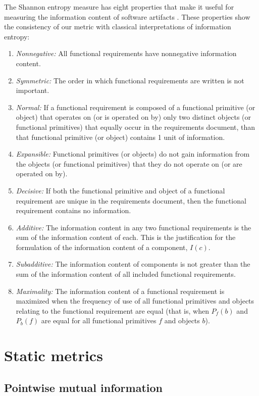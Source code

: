\documentclass{article}
\begin{document}
The Shannon entropy measure has eight properties that make it useful
for measuring the information content of software artifacts
\cite{abd-el-hafiz}. These properties show the consistency of our
metric with classical interpretations of information entropy:
\begin{enumerate}
\item \textit{Nonnegative:} All functional requirements have
  nonnegative information content.
\item \textit{Symmetric:} The order in which functional requirements
  are written is not important.
\item \textit{Normal:} If a functional requirement is composed of a
  functional primitive (or object) that operates on (or is operated on
  by) only two distinct objects (or functional primitives) that
  equally occur in the requirements document, than that functional
  primitive (or object) contains 1 unit of information.
\item \textit{Expansible:} Functional primitives (or objects) do not
  gain information from the objects (or functional primitives) that
  they do not operate on (or are operated on by).
\item \textit{Decisive:} If both the functional primitive and object
  of a functional requirement are unique in the requirements document,
  then the functional requirement contains no information.
\item \textit{Additive:} The information content in any two functional
  requirements is the sum of the information content of each. This is
  the justification for the formulation of the information content of
  a component, $I(c)$.
\item \textit{Subadditive:} The information content of components is
  not greater than the sum of the information content of all included
  functional requirements.
\item \textit{Maximality:} The information content of a functional
  requirement is maximized when the frequency of use of all functional
  primitives and objects relating to the functional requirement are
  equal (that is, when $P_f(b)$ and $P_b(f)$ are equal for all
  functional primitives $f$ and objects $b$).
\end{enumerate}


\section{Static metrics}

\subsection{Pointwise mutual information}
\end{document}
